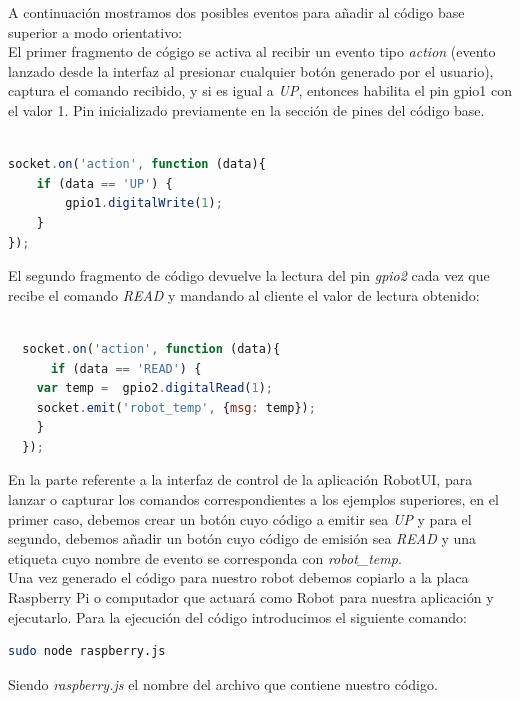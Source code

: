 A continuación mostramos dos posibles eventos para añadir al código base superior a modo orientativo:\\

El primer fragmento de cógigo se activa al recibir un evento tipo \emph{action} (evento lanzado desde la interfaz al presionar cualquier botón generado por el usuario), captura el comando recibido,
y si es igual a \emph{UP}, entonces habilita el pin gpio1 con el valor 1. Pin inicializado previamente en la sección de pines del código base.\\

\begin{lstlisting}[language=JavaScript]

socket.on('action', function (data){
    if (data == 'UP') {
        gpio1.digitalWrite(1);
    }
});

\end{lstlisting}

El segundo fragmento de código devuelve la lectura del pin \emph{gpio2} cada vez que recibe el comando \emph{READ} y mandando al cliente el valor de lectura obtenido:\\

\begin{lstlisting}[language=JavaScript]

  socket.on('action', function (data){
      if (data == 'READ') {
	var temp =  gpio2.digitalRead(1);
	socket.emit('robot_temp', {msg: temp});
    }
  });
\end{lstlisting}
 

En la parte referente a la interfaz de control de la aplicación RobotUI, para lanzar o capturar los comandos correspondientes a los ejemplos superiores, en el primer caso, debemos crear un botón 
cuyo código a emitir sea \emph{UP} y para el segundo, debemos añadir un botón cuyo código de emisión sea \emph{READ} y una etiqueta cuyo nombre de evento se corresponda con \emph{robot\_temp}.\\

Una vez generado el código para nuestro robot debemos copiarlo a la placa Raspberry Pi o computador que actuará como Robot para nuestra aplicación y ejecutarlo. Para la ejecución del código
introducimos el siguiente comando:\\

\begin{lstlisting}[language=bash]
  sudo node raspberry.js
\end{lstlisting}

Siendo \emph{raspberry.js} el nombre del archivo que contiene nuestro código.

